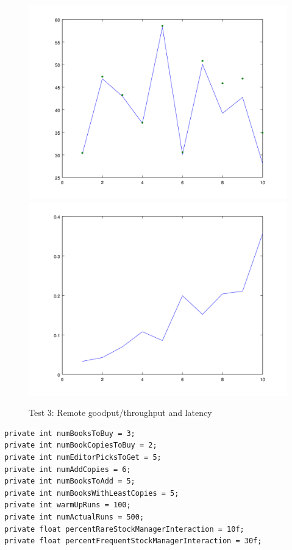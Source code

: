 \documentclass{article}      %
\begin{document}
\begin{figure}[ht]
\centering
 \includegraphics[scale=.33]{graphs/graph6-goodput}
 \includegraphics[scale=.33]{graphs/graph6-latency}
\caption{Test 3: Remote goodput/throughput and latency \label{overflow}}
\end{figure}

\begin{verbatim}
private int numBooksToBuy = 3;
private int numBookCopiesToBuy = 2;
private int numEditorPicksToGet = 5;
private int numAddCopies = 6;
private int numBooksToAdd = 5;
private int numBooksWithLeastCopies = 5;
private int warmUpRuns = 100;
private int numActualRuns = 500;
private float percentRareStockManagerInteraction = 10f;
private float percentFrequentStockManagerInteraction = 30f;
\end{verbatim}
 
\end{document}
